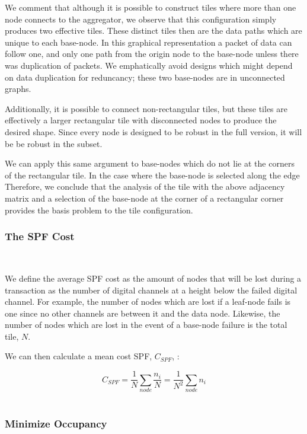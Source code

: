 We comment that although it is possible to construct tiles where more than one node connects to the aggregator, we observe that this configuration simply produces two effective tiles.
These distinct tiles then are the data paths which are unique to each base-node.
In this graphical representation a packet of data can follow one, and only one path from the origin node to the base-node unless there was duplication of packets.
We emphatically avoid designs which might depend on data duplication for reduncancy; these two base-nodes are in unconnected graphs.

Additionally, it is possible to connect non-rectangular tiles, but these tiles are effectively a larger rectangular tile with disconnected nodes to produce the desired shape.
Since every node is designed to be robust in the full version, it will be be robust in the subset.

We can apply this same argument to base-nodes which do not lie at the corners of the rectangular tile.
In the case where the base-node is selected along the edge
Therefore, we conclude that the analysis of the tile with the above adjacency matrix and a selection of the base-node at the corner of a rectangular corner provides the basis problem to the tile configuration.

\subsubsection{The SPF Cost}~\label{sec:spf_cost}

We define the average SPF cost as the amount of nodes that will be lost during a transaction as the number of digital channels at a height below the failed digital channel.
For example, the number of nodes which are lost if a leaf-node fails is one since no other channels are between it and the data node.
Likewise, the number of nodes which are lost in the event of a base-node failure is the total tile, $N$.

We can then calculate a mean cost SPF, $C_{SPF}$, :

\begin{equation}
  C_{SPF} = \frac{1}{N}\sum_{node} \frac{n_{i}}{N} = \frac{1}{N^{2}}\sum_{node} n_{i}
\end{equation}~\label{eq:cspf}

\subsubsection{Minimize Occupancy}~\label{sec:min_conn}

